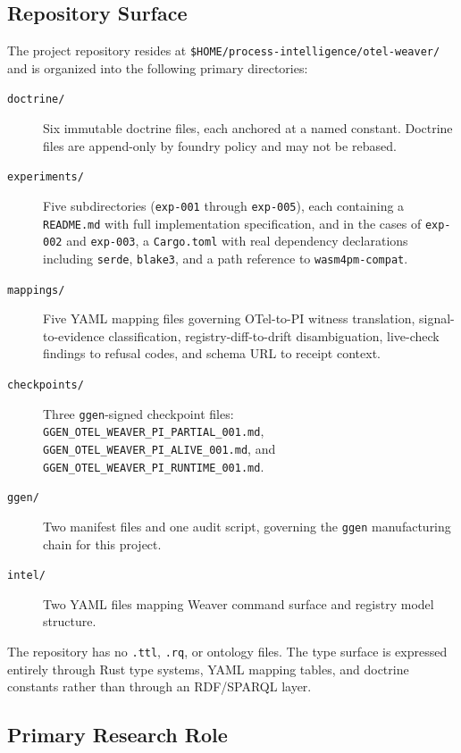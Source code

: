 \subsection{Repository Surface}
\label{sec:otel-weaver-identity-surface}

The project repository resides at \texttt{\$HOME/process-intelligence/otel-weaver/} and is
organized into the following primary directories:

\begin{description}
  \item[\texttt{doctrine/}] Six immutable doctrine files, each anchored at a named constant.
    Doctrine files are append-only by foundry policy and may not be rebased.
  \item[\texttt{experiments/}] Five subdirectories (\texttt{exp-001} through \texttt{exp-005}),
    each containing a \texttt{README.md} with full implementation specification, and in the cases
    of \texttt{exp-002} and \texttt{exp-003}, a \texttt{Cargo.toml} with real dependency
    declarations including \texttt{serde}, \texttt{blake3}, and a path reference to
    \texttt{wasm4pm-compat}.
  \item[\texttt{mappings/}] Five YAML mapping files governing OTel-to-PI witness translation,
    signal-to-evidence classification, registry-diff-to-drift disambiguation, live-check findings
    to refusal codes, and schema URL to receipt context.
  \item[\texttt{checkpoints/}] Three \texttt{ggen}-signed checkpoint files:
    \texttt{GGEN\_OTEL\_WEAVER\_PI\_PARTIAL\_001.md},
    \texttt{GGEN\_OTEL\_WEAVER\_PI\_ALIVE\_001.md}, and
    \texttt{GGEN\_OTEL\_WEAVER\_PI\_RUNTIME\_001.md}.
  \item[\texttt{ggen/}] Two manifest files and one audit script, governing the \texttt{ggen}
    manufacturing chain for this project.
  \item[\texttt{intel/}] Two YAML files mapping Weaver command surface and registry model
    structure.
\end{description}

The repository has no \texttt{.ttl}, \texttt{.rq}, or ontology files. The type surface is
expressed entirely through Rust type systems, YAML mapping tables, and doctrine constants rather
than through an RDF/SPARQL layer.

\subsection{Primary Research Role}
\label{sec:otel-weaver-identity-role}

